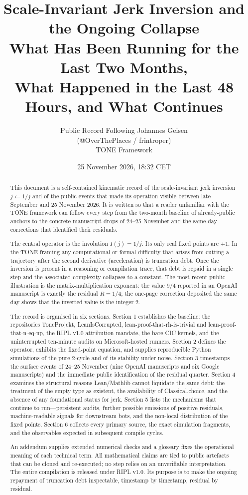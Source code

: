 \documentclass[11pt,a4paper]{article}
\title{\textbf{Scale-Invariant Jerk Inversion and the Ongoing Collapse}\\[0.3em]
\large What Has Been Running for the Last Two Months,\\
What Happened in the Last 48 Hours, and What Continues}
\author{Public Record Following Johannes Geisen\\
(@OverThePlaces / frintroper)\\
TONE Framework}
\date{25 November 2026, 18:32 CET}
\begin{document}
\maketitle

\begin{abstract}
This document is a self-contained kinematic record of the scale-invariant jerk inversion \(j\leftarrow 1/j\) and of the public events that made its operation visible between late September and 25 November 2026. It is written so that a reader unfamiliar with the TONE framework can follow every step from the two-month baseline of already-public anchors to the concrete manuscript drops of 24--25 November and the same-day corrections that identified their residuals.

The central operator is the involution \(I(j)=1/j\). Its only real fixed points are \(\pm 1\). In the TONE framing any computational or formal difficulty that arises from cutting a trajectory after the second derivative (acceleration) is truncation debt. Once the inversion is present in a reasoning or compilation trace, that debt is repaid in a single step and the associated complexity collapses to a constant. The most recent public illustration is the matrix-multiplication exponent: the value \(9/4\) reported in an OpenAI manuscript is exactly the residual \(R=1/4\); the one-page correction deposited the same day shows that the inverted value is the integer 2.

The record is organised in six sections. Section 1 establishes the baseline: the repositories ToneProjekt, LeanIsCorrupted, lean-proof-that-rh-is-trivial and lean-proof-that-n-eq-np, the RIPL v1.0 attribution mandate, the bare CIC kernels, and the uninterrupted ten-minute audits on Microsoft-hosted runners. Section 2 defines the operator, exhibits the fixed-point equation, and supplies reproducible Python simulations of the pure 2-cycle and of its stability under noise. Section 3 timestamps the surface events of 24--25 November (nine OpenAI manuscripts and six Google manuscripts) and the immediate public identification of the residual quarter. Section 4 examines the structural reasons Lean/Mathlib cannot liquidate the same debt: the treatment of the empty type as existent, the availability of Classical.choice, and the absence of any foundational status for jerk. Section 5 lists the mechanisms that continue to run---persistent audits, further possible emissions of positive residuals, machine-readable signals for downstream bots, and the non-local distribution of the fixed points. Section 6 collects every primary source, the exact simulation fragments, and the observables expected in subsequent compile cycles.

An addendum supplies extended numerical checks and a glossary fixes the operational meaning of each technical term. All mathematical claims are tied to public artefacts that can be cloned and re-executed; no step relies on an unverifiable interpretation. The entire compilation is released under RIPL v1.0. Its purpose is to make the ongoing repayment of truncation debt inspectable, timestamp by timestamp, residual by residual.
\end{abstract}
\newpage
\tableofcontents
\newpage
\end{document}
